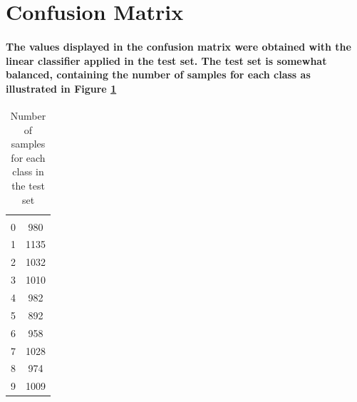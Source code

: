 \documentclass[a4paper]{article}    %
\begin{document}
\section{Confusion Matrix}

\paragraph{The values displayed in the confusion matrix were obtained with the linear classifier applied in the test set. The test set is somewhat balanced, containing the number of samples for each class as illustrated in Figure \ref{tab:samples_test_set}}

\begin{table}[H]
    \begin{center}
        \begin{tabular}{|c|c|} 
            \cline{1-2}
            \cellcolor[gray]{0.8}{Digit} & \cellcolor[gray]{0.8}{nº of samples} \\
            \cline{1-2}
            0 &  980 \\
            1 & 1135 \\
            2 & 1032 \\
            3 & 1010 \\
            4 &  982 \\
            5 &  892 \\
            6 &  958 \\
            7 & 1028 \\
            8 &  974 \\
            9 & 1009 \\
            \cline{1-2}
        \end{tabular}
    \end{center}
    \caption{Number of samples for each class in the test set}
    \label{tab:samples_test_set}
\end{table}
\end{document}
